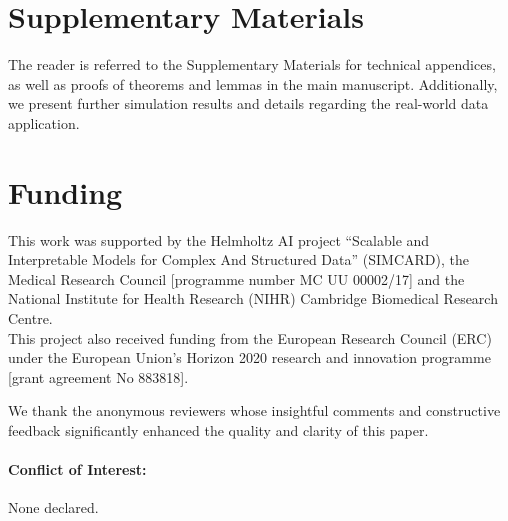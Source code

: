 \documentclass[ejs]{imsart}
\theoremstyle{plain}
\begin{document}
\section*{Supplementary Materials}\label{sec::sm}

The reader is referred to the Supplementary Materials for technical appendices, as well as proofs of theorems and lemmas in the main manuscript. Additionally, we present further simulation results and details regarding the real-world data application.

\section*{Funding}

This work was supported by the Helmholtz AI project
``Scalable and Interpretable Models for Complex And Structured Data'' (SIMCARD),
the Medical Research Council [programme number
MC UU 00002/17] and the National Institute for Health Research (NIHR) Cambridge Biomedical Research Centre.
\\

\noindent This project also received funding from the European Research Council (ERC) under the European Union’s Horizon 2020 research and innovation programme [grant agreement No 883818].





\begin{acks}[Acknowledgments]
    We thank the anonymous reviewers whose insightful comments and constructive feedback significantly enhanced the quality and clarity of this paper.

    \paragraph{Conflict of Interest:} None declared.
\end{acks}


%


\end{document}
